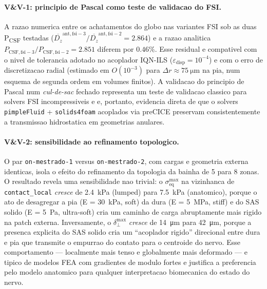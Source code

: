 \paragraph{V\&V-1: principio de Pascal como teste de validacao do FSI.} A razao numerica entre os achatamentos do globo nas variantes FSI sob as duas P\textsubscript{CSF} testadas ($\overline{D_z}^{\mathrm{ant,fsi-3}} / \overline{D_z}^{\mathrm{ant,fsi-2}} = 2.864$) e a razao analitica $P_{\mathrm{CSF,fsi-3}} / P_{\mathrm{CSF,fsi-2}} = 2.851$ diferem por $0.46\%$. Esse residual e compativel com o nivel de tolerancia adotado no acoplador IQN-ILS ($\varepsilon_{\mathrm{disp}} = 10^{-4}$) e com o erro de discretizacao radial (estimado em $O(10^{-3})$ para $\Delta r \approx \SI{75}{\micro\meter}$ na pia, num esquema de segunda ordem em volumes finitos). A validacao do principio de Pascal num \emph{cul-de-sac} fechado representa um teste de validacao classico para solvers FSI incompressiveis e e, portanto, evidencia direta de que o solvers \texttt{pimpleFluid} + \texttt{solids4foam} acoplados via preCICE preservam consistentemente a transmissao hidrostatica em geometrias anulares.

\paragraph{V\&V-2: sensibilidade ao refinamento topologico.} O par \texttt{on-mestrado-1} versus \texttt{on-mestrado-2}, com cargas e geometria externa identicas, isola o efeito do refinamento da topologia da bainha de 5 para 8 zonas. O resultado revela uma sensibilidade nao trivial: o $\sigma_{\mathrm{eq}}^{\max}$ na vizinhanca de \texttt{contact\_local} \emph{cresce} de \SI{2.4}{\kilo\pascal} (lumped) para \SI{7.5}{\kilo\pascal} (anatomico), porque o ato de desagregar a pia (E = \SI{30}{\kilo\pascal}, soft) da dura (E = \SI{5}{\mega\pascal}, stiff) e do SAS solido (E = \SI{5}{\pascal}, ultra-soft) cria um caminho de carga abruptamente mais rigido na patch externa. Inversamente, o $\delta_{\perp}^{\max}$ \emph{cresce} de \SI{14}{\micro\meter} para \SI{42}{\micro\meter}, porque a presenca explicita do SAS solido cria um ``acoplador rigido'' direcional entre dura e pia que transmite o empurrao do contato para o centroide do nervo. Esse comportamento --- localmente mais tenso e globalmente mais deformado --- e tipico de modelos FEA com gradientes de modulo fortes \citep{Sigal2004} e justifica a preferencia pelo modelo anatomico para qualquer interpretacao biomecanica do estado do nervo.

